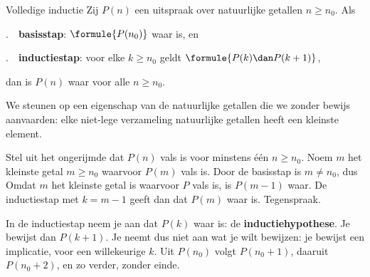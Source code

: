 \begin{theorie}
\begin{stelling}{Volledige inductie}
Zij $P(n)$ een uitspraak over natuurlijke getallen $n \geqslant n_0$. Als

\vspace{1mm}
.\ \ \textbf{\textcolor{accent}{basisstap}}: $\formule{P(n_0)}$ waar is, en

.\ \ \textbf{\textcolor{accent}{inductiestap}}: voor elke $k \geqslant n_0$ geldt $\formule{P(k) \dan P(k + 1)}$,

\vspace{1mm}
dan is $P(n)$ waar voor alle $n \geqslant n_0$.
\end{stelling}

\begin{bewijs}
We steunen op een eigenschap van de natuurlijke getallen die we zonder bewijs aanvaarden: elke niet-lege verzameling natuurlijke getallen heeft een kleinste element.

Stel uit het ongerijmde dat $P(n)$ vals is voor minstens één $n \geqslant n_0$. Noem $m$ het kleinste getal $m \geqslant n_0$ waarvoor $P(m)$ vals is. Door de basisstap is $m \neq n_0$, dus
Omdat $m$ het kleinste getal is waarvoor $P$ vals is, is $P(m - 1)$ waar. De inductiestap met $k = m - 1$ geeft dan dat $P(m)$ waar is. Tegenspraak.
\end{bewijs}
\end{theorie}

In de inductiestap neem je aan dat $P(k)$ waar is: de \textbf{inductiehypothese}. Je bewijst dan $P(k + 1)$. Je neemt dus niet aan wat je wilt bewijzen: je bewijst een implicatie, voor een willekeurige $k$. Uit $P(n_0)$ volgt $P(n_0 + 1)$, daaruit $P(n_0 + 2)$, en zo verder, zonder einde.


